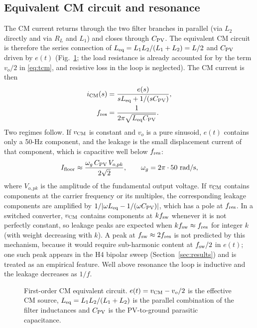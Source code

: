 \subsection{Equivalent CM circuit and resonance}
The CM current returns through the two filter branches in parallel (via $L_2$ directly and via $R_L$ and $L_1$) and closes through $C_{\mathrm{PV}}$. The equivalent CM circuit is therefore the series connection of $L_{\mathrm{eq}}=L_1L_2/(L_1+L_2)=L/2$ and $C_{\mathrm{PV}}$ driven by $e(t)$ (Fig.~\ref{fig:cmcircuit}; the load resistance is already accounted for by the term $v_o/2$ in \eqref{eq:tcm}, and resistive loss in the loop is neglected). The CM current is then
\begin{align}
i_{\mathrm{CM}}(s)&=\frac{e(s)}{sL_{\mathrm{eq}}+1/(sC_{\mathrm{PV}})},\label{eq:icm}\\
f_{\mathrm{res}}&=\frac{1}{2\pi\sqrt{L_{\mathrm{eq}}C_{\mathrm{PV}}}}.\label{eq:fres}
\end{align}
Two regimes follow. If $v_{\mathrm{CM}}$ is constant and $v_o$ is a pure sinusoid, $e(t)$ contains only a 50-Hz component, and the leakage is the small displacement current of that component, which is capacitive well below $f_{\mathrm{res}}$:
\begin{equation}
I_{\mathrm{floor}}\approx\frac{\omega_g\,C_{\mathrm{PV}}\,V_{o,pk}}{2\sqrt{2}},\qquad \omega_g=2\pi\cdot 50~\mathrm{rad/s},
\label{eq:floor}
\end{equation}
where $V_{o,pk}$ is the amplitude of the fundamental output voltage. If $v_{\mathrm{CM}}$ contains components at the carrier frequency or its multiples, the corresponding leakage components are amplified by $1/|\omega L_{\mathrm{eq}}-1/(\omega C_{\mathrm{PV}})|$, which has a pole at $f_{\mathrm{res}}$. In a switched converter, $v_{\mathrm{CM}}$ contains components at $kf_{\mathrm{sw}}$ whenever it is not perfectly constant, so leakage peaks are expected when $kf_{\mathrm{sw}}\approx f_{\mathrm{res}}$ for integer $k$ (with weight decreasing with $k$). A peak at $f_{\mathrm{sw}}\approx2f_{\mathrm{res}}$ is not predicted by this mechanism, because it would require sub-harmonic content at $f_{\mathrm{sw}}/2$ in $e(t)$; one such peak appears in the H4 bipolar sweep (Section~\ref{sec:results}) and is treated as an empirical feature. Well above resonance the loop is inductive and the leakage decreases as $1/f$.

\begin{figure}[!t]
\centering
{}
\caption{First-order CM equivalent circuit. $e(t)=v_{\mathrm{CM}}-v_o/2$ is the effective CM source, $L_{\mathrm{eq}}=L_1L_2/(L_1+L_2)$ is the parallel combination of the filter inductances and $C_{\mathrm{PV}}$ is the PV-to-ground parasitic capacitance.}
\label{fig:cmcircuit}
\end{figure}

